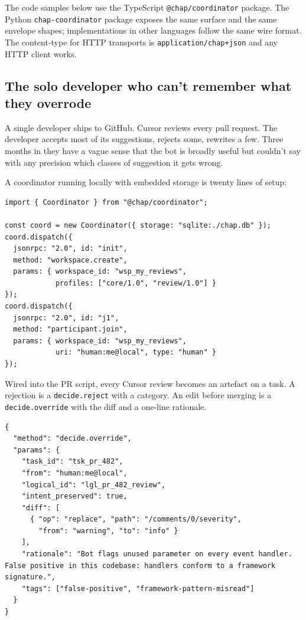 \documentclass[11pt]{article}
\begin{document}
The code samples below use the TypeScript \texttt{@chap/coordinator} package. The Python \texttt{chap-coordinator} package exposes the same surface and the same envelope shapes; implementations in other languages follow the same wire format. The content-type for HTTP transports is \texttt{application/chap+json} and any HTTP client works.

\subsection{The solo developer who can't remember what they overrode}

A single developer ships to GitHub. Cursor reviews every pull request. The developer accepts most of its suggestions, rejects some, rewrites a few. Three months in they have a vague sense that the bot is broadly useful but couldn't say with any precision which classes of suggestion it gets wrong.

A coordinator running locally with embedded storage is twenty lines of setup:

\begin{lstlisting}[caption={Bootstrap a local coordinator.},label={lst:case1-bootstrap}]
import { Coordinator } from "@chap/coordinator";

const coord = new Coordinator({ storage: "sqlite:./chap.db" });
coord.dispatch({
  jsonrpc: "2.0", id: "init",
  method: "workspace.create",
  params: { workspace_id: "wsp_my_reviews",
            profiles: ["core/1.0", "review/1.0"] }
});
coord.dispatch({
  jsonrpc: "2.0", id: "j1",
  method: "participant.join",
  params: { workspace_id: "wsp_my_reviews",
            uri: "human:me@local", type: "human" }
});
\end{lstlisting}

Wired into the PR script, every Cursor review becomes an artefact on a task. A rejection is a \texttt{decide.reject} with a category. An edit before merging is a \texttt{decide.override} with the diff and a one-line rationale.

\begin{lstlisting}[caption={Capturing an override.},label={lst:case1-override}]
{
  "method": "decide.override",
  "params": {
    "task_id": "tsk_pr_482",
    "from": "human:me@local",
    "logical_id": "lgl_pr_482_review",
    "intent_preserved": true,
    "diff": [
      { "op": "replace", "path": "/comments/0/severity",
        "from": "warning", "to": "info" }
    ],
    "rationale": "Bot flags unused parameter on every event handler. False positive in this codebase: handlers conform to a framework signature.",
    "tags": ["false-positive", "framework-pattern-misread"]
  }
}
\end{lstlisting}
\end{document}
